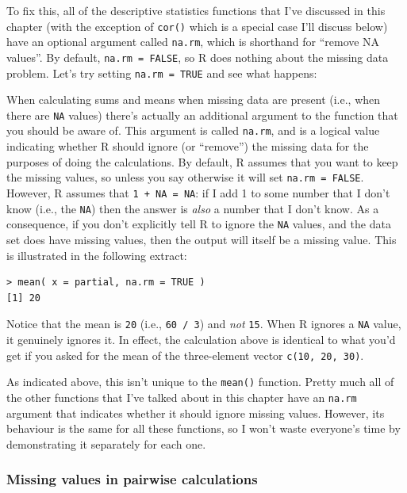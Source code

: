 \documentclass[
]{book}
\begin{document}
To fix this, all of the descriptive statistics functions that I've discussed in this chapter (with the exception of \texttt{cor()} which is a special case I'll discuss below) have an optional argument called \texttt{na.rm}, which is shorthand for ``remove NA values''. By default, \texttt{na.rm\ =\ FALSE}, so R does nothing about the missing data problem. Let's try setting \texttt{na.rm\ =\ TRUE} and see what happens:

When calculating sums and means when missing data are present (i.e., when there are \texttt{NA} values) there's actually an additional argument to the function that you should be aware of. This argument is called \texttt{na.rm}, and is a logical value indicating whether R should ignore (or ``remove'') the missing data for the purposes of doing the calculations. By default, R assumes that you want to keep the missing values, so unless you say otherwise it will set \texttt{na.rm\ =\ FALSE}. However, R assumes that \texttt{1\ +\ NA\ =\ NA}: if I add 1 to some number that I don't know (i.e., the \texttt{NA}) then the answer is \emph{also} a number that I don't know. As a consequence, if you don't explicitly tell R to ignore the \texttt{NA} values, and the data set does have missing values, then the output will itself be a missing value. This is illustrated in the following extract:

\begin{verbatim}
> mean( x = partial, na.rm = TRUE )
[1] 20
\end{verbatim}

Notice that the mean is \texttt{20} (i.e., \texttt{60\ /\ 3}) and \emph{not} \texttt{15}. When R ignores a \texttt{NA} value, it genuinely ignores it. In effect, the calculation above is identical to what you'd get if you asked for the mean of the three-element vector \texttt{c(10,\ 20,\ 30)}.

As indicated above, this isn't unique to the \texttt{mean()} function. Pretty much all of the other functions that I've talked about in this chapter have an \texttt{na.rm} argument that indicates whether it should ignore missing values. However, its behaviour is the same for all these functions, so I won't waste everyone's time by demonstrating it separately for each one.

\hypertarget{missing-values-in-pairwise-calculations}{%
\subsubsection{Missing values in pairwise calculations}\label{missing-values-in-pairwise-calculations}}
\end{document}
